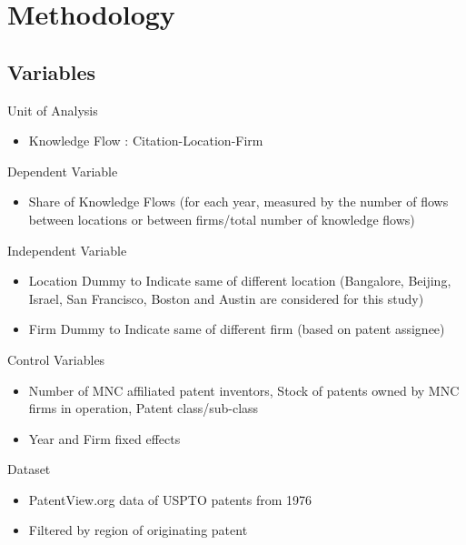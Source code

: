 \documentclass{beamer}
\begin{document}
\section{Methodology}
\subsection{Variables}
\begin{frame}{Unit of Analysis}{}
\begin{itemize}
\item<1->{Knowledge Flow : Citation-Location-Firm}
\end{itemize}
\end{frame}

\begin{frame}{Dependent Variable}{}
\begin{itemize}
\item<1->{Share of Knowledge Flows (for each year, measured by the number of flows between locations or between firms/total number of knowledge flows)}
\end{itemize}
\end{frame}

\begin{frame}{Independent Variable}{}
\begin{itemize}
\item<1->{Location Dummy to Indicate same of different location (Bangalore, Beijing, Israel, San Francisco, Boston and Austin are considered for this study)}
\item<2->{Firm Dummy to Indicate same of different firm (based on patent assignee)}
\end{itemize}
\end{frame}

\begin{frame}{Control Variables}{}
\begin{itemize}
\item<1->{Number of MNC affiliated patent inventors, Stock of patents owned by MNC firms in operation, Patent class/sub-class}
\item<2->{Year and Firm fixed effects}
\end{itemize}
\end{frame}

\begin{frame}{Dataset}{}
\begin{itemize}
\item<1->{PatentView.org data of USPTO patents from 1976}
\item<2->{Filtered by region of originating patent}
\end{itemize}
\end{frame}
\end{document}
